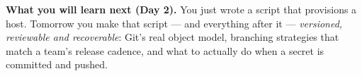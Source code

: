 \begin{keyidea}
\textbf{What you will learn next (Day 2).} You just wrote a script that provisions a host. Tomorrow you make that script --- and everything after it --- \emph{versioned, reviewable and recoverable}: Git's real object model, branching strategies that match a team's release cadence, and what to actually do when a secret is committed and pushed.
\end{keyidea}
